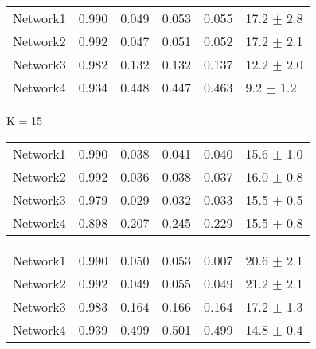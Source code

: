 \begin{table*}[h]
\begin{minipage}[h]{0.45\linewidth}
\begin{tabular}{llllll}
\hline
\end{tabular}
\end{minipage}
\hspace{0.8cm}
\begin{minipage}[h]{0.45\linewidth}
\begin{tabular}{llllll}
Network1      &    0.990 &       0.049 &    0.053 &  0.055 &  17.2 $\pm$ 2.8 \\
Network2     &    0.992 &       0.047 &    0.051 &   0.052 &  17.2 $\pm$ 2.1 \\
Network3      &    0.982 &       0.132 &    0.132 &  0.137 &  12.2 $\pm$ 2.0 \\
Network4     &    0.934 &       0.448 &    0.447 &   0.463 &  9.2 $\pm$ 1.2 \\

\hline
\end{tabular}
\end{minipage}


	\begin{minipage}[h]{0.45\linewidth} 
K = 15
\begin{tabular}{lrrrrr}
Network1        &    0.990 &       0.038 &    0.041 &    0.040 &  15.6 $\pm$ 1.0 \\
Network2       &    0.992 &       0.036 &    0.038 &     0.037 &  16.0 $\pm$ 0.8 \\
Network3        &    0.979 &       0.029 &    0.032 &    0.033 &  15.5 $\pm$ 0.5 \\
Network4       &    0.898 &       0.207 &    0.245 &     0.229 &  15.5 $\pm$ 0.8 \\

\hline
\end{tabular}
\end{minipage}
\hspace{0.8cm}
\begin{minipage}[h]{0.45\linewidth}
\begin{tabular}{lrrrrr}
Network1      &    0.990 &       0.050 &    0.053 &  0.007 &      20.6 $\pm$ 2.1 \\
Network2     &    0.992 &       0.049 &    0.055 &   0.049 &      21.2 $\pm$ 2.1 \\
Network3      &    0.983 &       0.164 &    0.166 &  0.164 &      17.2 $\pm$ 1.3 \\
Network4     &    0.939 &       0.499 &    0.501 &   0.499 &      14.8 $\pm$ 0.4    \\

\hline
\end{tabular}
\end{minipage}


\end{table*}

